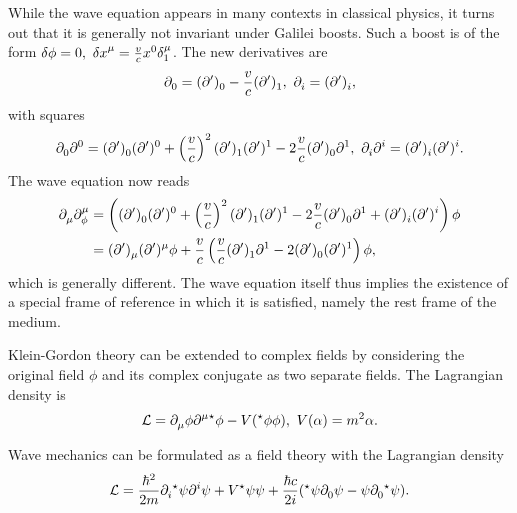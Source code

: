 While the wave equation appears in many contexts in classical physics, it turns out that it is generally not invariant under Galilei boosts. Such a boost is of the form $\var{\phi} = 0,\ \var{x}^{\mu} = \frac{v}{c}x^{0}\delta_{1}^{\mu}$. The new derivatives are
\begin{align*}
	\del{}{0} = \delp{0} - \frac{v}{c}\delp{1},\ \del{}{i} = \delp{i},
\end{align*}
with squares
\begin{align*}
	\del{}{0}{\del{0}{}} = \delp{0}{\delp[0]{}{}} + \left(\frac{v}{c}\right)^{2}\delp{1}{\delp[1]{}{}} - 2\frac{v}{c}\delp{0}{\del{1}{}},\ \del{}{i}{\del{i}{}} = \delp{i}{\delp[i]{}{}}.
\end{align*}
The wave equation now reads
\begin{align*}
	\del{}{\mu}\del{\mu}{\phi} &= \left(\delp{0}{\delp[0]{}{}} + \left(\frac{v}{c}\right)^{2}\delp{1}{\delp[1]{}{}} - 2\frac{v}{c}\delp{0}{\del{1}{}} + \delp{i}{\delp[i]{}{}}\right)\phi \\
	                             &= \delp{\mu}{\delp[\mu]{}{\phi}} + \frac{v}{c}\left(\frac{v}{c}\delp{1}{\del{1}{}} - 2\delp{0}{\delp[1]{}{}}\right)\phi,
\end{align*}
which is generally different. The wave equation itself thus implies the existence of a special frame of reference in which it is satisfied, namely the rest frame of the medium.

Klein-Gordon theory can be extended to complex fields by considering the original field $\phi$ and its complex conjugate as two separate fields. The Lagrangian density is
\begin{align*}
	\lag = \del{}{\mu}{\phi}\del{\mu}{}{\cc{\phi}} - V(\cc{\phi}\phi),\ V(\alpha) = m^{2}\alpha.
\end{align*}

Wave mechanics can be formulated as a field theory with the Lagrangian density
\begin{align*}
	\lag = \frac{\hbar^{2}}{2m}\del{}{i}{\cc{\psi}}\del{i}{}{\psi} + V\cc{\psi}\psi + \frac{\hbar c}{2i}(\cc{\psi}\del{}{0}{\psi} - \psi\del{}{0}{\cc{\psi}}).
\end{align*}

